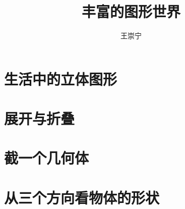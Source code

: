 \documentclass{article}
\title{丰富的图形世界}
\author{王崇宁}
\begin{document}
\section{生活中的立体图形}

\section{展开与折叠}
\section{截一个几何体}
\section{从三个方向看物体的形状}
\end{document}

